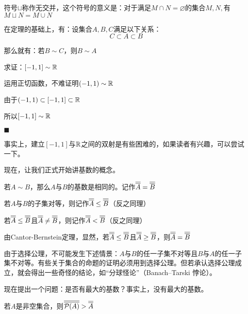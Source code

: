 \begin{remark}
    符号$\sqcup$称作无交并，这个符号的意义是：对于满足$M\cap N = \varnothing$的集合$M,N,$有$M\sqcup N = M\cup N$
\end{remark}

在定理的基础上，有：设集合$A,B,C$满足以下关系：
\[C\subset A \subset B\]

那么就有：若$B\sim C$，则$B\sim A$

\begin{example}
    求证：$[-1,1]\sim \mathbb{R}$
\end{example}

运用正切函数，不难证明$(-1,1)\sim \mathbb{R}$

由于$(-1,1)\subset [-1,1] \subset \mathbb{R}$

所以$[-1,1]\sim \mathbb{R}$

$\blacksquare $

事实上，建立$[-1,1]$与$\mathbb{R}$之间的双射是有些困难的，如果读者有兴趣，可以尝试一下。

现在，让我们正式开始讲基数的概念。

\begin{definition}[基数（势）]
    若$A\sim B$，那么$A$与$B$的基数是相同的。记作$\overline{\overline{A}} = \overline{\overline{B}}$

    若$A$与$B$的子集对等，则记作$\overline{\overline{A}}\leq \overline{\overline{B}}$（反之同理）

    若$\overline{\overline{A}}\leq \overline{\overline{B}}$且$\overline{\overline{A}}\neq \overline{\overline{B}}$，则记作$\overline{\overline{A}}< \overline{\overline{B}}$（反之同理）
\end{definition}

由Cantor-Bernstein定理，显然，若$\overline{\overline{A}}\leq \overline{\overline{B}}$且$\overline{\overline{A}}\geq \overline{\overline{B}}$，则$\overline{\overline{A}} = \overline{\overline{B}}$

\begin{remark}
    由于选择公理，不可能发生下述情景：$A$与$B$的任一子集不对等且$B$与$A$的任一子集不对等。有些关于集合的命题的证明必须用到选择公理。但若承认选择公理成立，就会得出一些奇怪的结论，如“分球怪论”（Banach–Tarski 悖论）。
\end{remark}

现在提出一个问题：是否有最大的基数？事实上，没有最大的基数。

\begin{theorem}[无最大基数定理]
    若$A$是非空集合，则$\overline{\overline{\mathcal{P} (A)}} >\overline{\overline{A}}$
\end{theorem}

